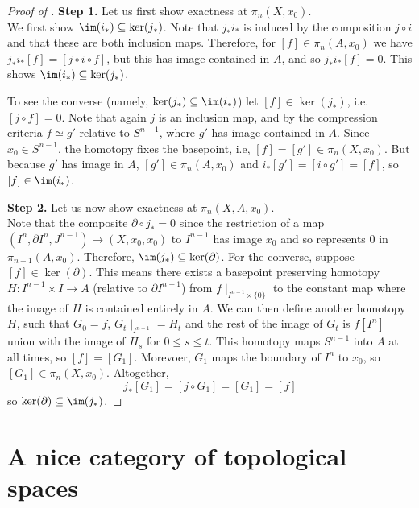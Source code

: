 \documentclass[a4paper]{tufte-book}
\theoremstyle{remark}
\begin{document}
\begin{proof}[Proof of ]
	\textbf{Step 1. }Let us first show exactness at $\pi_n(X,x_0)$. \\

	We first show $\im(i_*) \subseteq \ker(j_*)$. Note that $j_*i_*$ is induced by the composition $j \circ i$ and that these are both inclusion maps. Therefore, for $[f] \in \pi_n(A,x_0)$ we have $j_*i_*[f] = [j \circ i \circ f]$, but this has image contained in $A$, and so $j_*i_*[f] = 0$. This shows $\im(i_*) \subseteq \ker(j_*)$. 

	To see the converse (namely, $\ker(j_*) \subseteq \im(i_*)$) let $[f] \in \ker(j_*)$, i.e. $[j \circ f] = 0$. Note that again $j$ is an inclusion map, and by the compression criteria $f \simeq g'$ relative to $S^{n-1}$, where $g'$ has image contained in $A$. Since $x_0 \in S^{n-1}$, the homotopy fixes the basepoint, i.e, $[f] = [g'] \in \pi_n(X,x_0)$. But because $g'$ has image in $A$, $[g'] \in \pi_n(A,x_0)$ and $i_*[g'] = [i \circ g'] = [f]$, so $[f] \in \im(i_*)$. 

	\textbf{Step 2. } Let us now show exactness at $\pi_n(X,A,x_0)$. \\

	Note that the composite $\partial \circ j_* = 0$ since the restriction of a map $(I^n,\partial I^n,J^{n-1}) \to (X,x_0,x_0)$ to $I^{n-1}$ has image $x_0$ and so represents $0$ in $\pi_{n-1}(A,x_0)$. Therefore, $\im(j_*) \subseteq \ker(\partial)$. For the converse, suppose $[f] \in \ker(\partial)$. This means there exists a basepoint preserving homotopy $H \colon I^{n-1} \times I \to A$ (relative to $\partial I^{n-1}$) from $f \mid_{I^{n-1} \times \{ 0 \}}$ to the constant map where the image of $H$ is contained entirely in $A$. We can then define another homotopy $H$, such that $G_0 = f$, $G_t \mid_{I^{n-1}} = H_t$ and the rest of the image of $G_t$ is $f[I^n]$ union with the image of $H_s$ for $0 \le s \le t$. This homotopy maps $S^{n-1}$ into $A$ at all times, so $[f] = [G_1]$. Morevoer, $G_1$ maps the boundary of $I^n$ to $x_0$, so $[G_1] \in \pi_n(X,x_0)$. Altogether, 
	\[
j_*[G_1] = [j \circ G_1] = [G_1] = [f]
	\]
	so $\ker(\partial) \subseteq \im(j_*)$. 
\end{proof}
\appendix
\chapter{A nice category of topological spaces}
\end{document}
